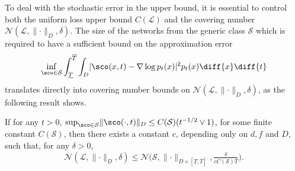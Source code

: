 \documentclass[a4paper, 11pt, headings = small, abstract]{scrartcl}
\begin{document}
To deal with the stochastic error in the upper bound, it is essential to control both the uniform loss upper bound $C(\mathcal{L})$ and the covering number $\mathcal{N}(\mathcal{L},\lVert \cdot \rVert_D,\delta)$. The size of the networks from the generic class $\mathcal{S}$ which is required to have a sufficient bound on the approximation error 
\[\inf_{\sco \in \mathcal{S}} \int_{\underline{T}}^{\overline{T}} \int_{D} \lvert \sco(x,t) - \nabla \log p_t(x) \rvert^2 p_t(x) \diff{x} \diff{t}\]
translates directly into covering number bounds on $\mathcal{N}(\mathcal{L}, \lVert \cdot \rVert_{D}, \delta)$, as the following result shows. 

\begin{lemma}\label{lem:cover}
If for any $t > 0$, $\sup_{\sco \in \mathcal{S}} \lVert  \sco(\cdot,t)  \rVert_{D} \leq C(\mathcal{S})(t^{-1/2} \vee 1)$, for some finite constant $C(\mathcal{S})$, then there exists a constant $c$, depending only on $d,f$ and $D$, such that, for any $\delta > 0$,
\[\mathcal{N}(\mathcal{L}, \lVert \cdot \rVert_D, \delta) \leq \mathcal{N}\big(\mathcal{S}, \lVert  \cdot  \rVert_{D \times [\underline{T},\overline{T}]}, \tfrac{\delta}{c C(\mathcal{S})\overline{T} }\big).\]
\end{lemma}
\end{document}
